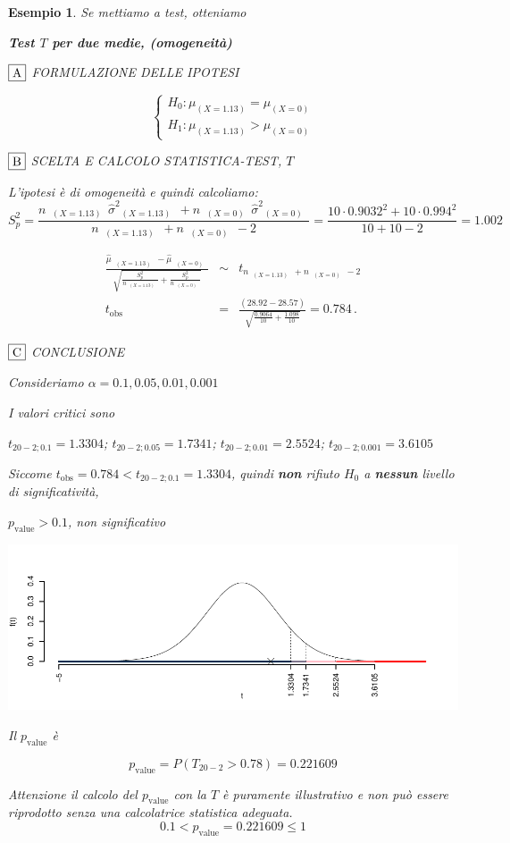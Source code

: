 \documentclass[
  11pt,
]{book}
\theoremstyle{mytheoremstyle}
\theoremstyle{mydefstyle}
\newtheorem{example}{{Esempio}}[section]
\begin{document}
\begin{example}
Se mettiamo a test, otteniamo

\textbf{Test \(T\) per due medie, (omogeneità)}

\(\fbox{A}\) FORMULAZIONE DELLE IPOTESI

\[\begin{cases}
   H_0: \mu_\text{$(X=1.13)$} = \mu_\text{$(X=0)$} \\
   H_1: \mu_\text{$(X=1.13)$} > \mu_\text{$(X=0)$} 
   \end{cases}\]

\(\fbox{B}\) SCELTA E CALCOLO STATISTICA-TEST, \(T\)

L'ipotesi è di omogeneità e quindi calcoliamo:\[
   S_p^2=\frac{n_\text{ $(X=1.13)$ }\hat\sigma^2_\text{ $(X=1.13)$ }+n_\text{ $(X=0)$ }\hat\sigma^2_\text{ $(X=0)$ }}{n_\text{ $(X=1.13)$ }+n_\text{ $(X=0)$ }-2} =
   \frac{ 10 \cdot 0.9032 ^2+ 10 \cdot 0.994 ^2}{ 10 + 10 -2}= 1.002 
  \]

\begin{eqnarray*}
  \frac{\hat\mu_\text{ $(X=1.13)$ } - \hat\mu_\text{ $(X=0)$ }}
  {\sqrt{\frac {S^2_p}{n_\text{ $(X=1.13)$ }}+\frac {S^2_p}{n_\text{ $(X=0)$ }}}}&\sim&t_{n_\text{ $(X=1.13)$ }+n_\text{ $(X=0)$ }-2}\\
  t_{\text{obs}}
  &=& \frac{ ( 28.92 -  28.57 )} {\sqrt{\frac{ 0.9064 }{ 10 }+\frac{ 1.098 }{ 10 }}}
  =   0.784 \, .
  \end{eqnarray*}

\(\fbox{C}\) CONCLUSIONE

Consideriamo \(\alpha=0.1, 0.05, 0.01, 0.001\)

I valori critici sono

\(t_{20-2;0.1}=1.3304\); \(t_{20-2;0.05}=1.7341\); \(t_{20-2;0.01}=2.5524\); \(t_{20-2;0.001}=3.6105\)

Siccome \(t_\text{obs}=0.784<t_{20-2;0.1}=1.3304\), quindi \textbf{non} rifiuto \(H_0\) a \textbf{nessun} livello di significatività,

\(p_\text{value}>0.1\), \emph{non significativo}

\begin{center}\includegraphics{Appunti_di_Statistica_2025_files/figure-latex/17-regressione-I-1-1} \end{center}

Il \(p_{\text{value}}\) è

\[ p_{\text{value}} = P(T_{20-2}>0.78)=0.221609 \]

Attenzione il calcolo del \(p_\text{value}\) con la \(T\) è puramente illustrativo e non può essere riprodotto senza una calcolatrice statistica adeguata.\[
 0.1 < p_\text{value}= 0.221609 \leq 1 
\]
\end{example}
\end{document}
